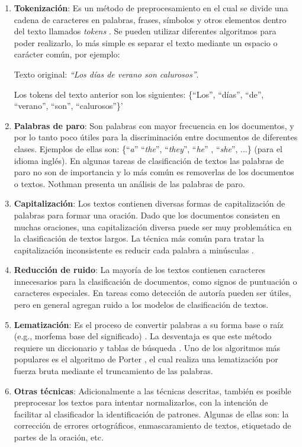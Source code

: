 \begin{enumerate}
\item \textbf{Tokenización}: Es un método de preprocesamiento en el cual se divide una cadena de caracteres en palabras, frases, símbolos y otros elementos dentro del texto llamados \textit{tokens} \citep{kowsari2019text}. Se pueden utilizar diferentes algoritmos para poder realizarlo, lo más simple es separar el texto mediante un espacio o carácter común, por ejemplo:

Texto original: \textit{``Los días de verano son calurosos''}.

Los tokens del texto anterior son los siguientes: \{``Los'',  ``días'', ``de'', ``verano'', ``son'', ``calurosos''\}'

\item \textbf{Palabras de paro}: Son palabras con mayor frecuencia en los documentos, y por lo tanto poco útiles para la discriminación entre documentos de diferentes clases. Ejemplos de ellas son: \{``\textit{a}'' ``\textit{the}'', ``\textit{they}'', ``\textit{he}'' , ``\textit{she}'', ...\} (para el idioma inglés). En algunas tareas de clasificación de textos las palabras de paro no son de importancia y lo más común es removerlas de los documentos o textos. Nothman \citep{nothman2018stop} presenta un análisis de las palabras de paro.

\item \textbf{Capitalización}: Los textos contienen diversas formas de capitalización de palabras para formar una oración. Dado que los documentos consisten en muchas oraciones, una capitalización diversa puede ser muy problemática en la clasificación de textos largos. La técnica más común para tratar la capitalización inconsistente es reducir cada palabra a minúsculas \citep{kowsari2019text}.

\item \textbf{Reducción de ruido}: La mayoría de los textos contienen caracteres innecesarios para la clasificación de documentos, como signos de puntuación o caracteres especiales. En tareas como detección de autoría pueden ser útiles, pero en general agregan ruido a los modelos de clasificación de textos.


\item \textbf{Lematización}:  Es el proceso de convertir palabras a su forma base o raíz (e.g., morfema base del significado) \citep{kamath2019deep}. La desventaja es que este método requiere un diccionario y tablas de búsqueda \citep{kamath2019deep}. Uno de los algoritmos más populares es el algoritmo de Porter \citep{porter2001snowball}, el cual realiza una lematización por fuerza bruta mediante el truncamiento de las palabras.

\item  \textbf{Otras técnicas}: Adicionalmente a las técnicas descritas, también es posible preprocesar los textos para intentar normalizarlos, con la intención de facilitar al clasificador la identificación de patrones. Algunas de ellas son: la corrección de errores ortográficos, enmascaramiento de textos, etiquetado de partes de la oración, etc.

\end{enumerate}


